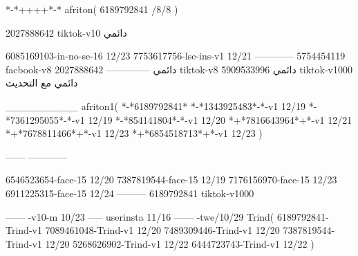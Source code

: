 *-*++++*-*
afriton(
6189792841 /8/8
)

2027888642 tiktok-v10
دائمي

6085169103-in-no-se-16 12/23
7753617756-lse-ins-v1 12/21
------------
5754454119 facbook-v8
دائمي
--------------
2027888642 tiktok-v8
دائمي
5909533996 tiktok-v1000
دائمي مع التحديث

__________
afriton1(
*-*6189792841*
*-*1343925483*-*-v1 12/19
*-*7361295055*-*-v1 12/19
*-*854141804*-*-v1 12/20
*+*7816643964*+*-v1 12/21
*+*7678811466*+*-v1 12/23
*+*6854518713*+*-v1 12/23
)

------
------------


6546523654-face-15 12/20
7387819544-face-15 12/19
7176156970-face-15 12/23
6911225315-face-15 12/24
---------
6189792841 tiktok-v1000
 
------
-v10-m 10/23
-----
userinsta 11/16
------
-twe/10/29
Trind(
6189792841-Trind-v1 
7089461048-Trind-v1 12/20
7489309446-Trind-v1 12/20
7387819544-Trind-v1 12/20
5268626902-Trind-v1 12/22
6444723743-Trind-v1 12/22
)
